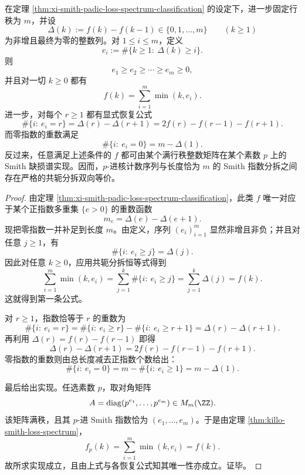 \begin{theorem}\label{thm:xi-smith-loss-spectrum-conjugate-partition-realization}
在定理 \ref{thm:xi-smith-padic-loss-spectrum-classification} 的设定下，进一步固定行秩为 \(m\)，并设
\[
\Delta(k):=f(k)-f(k-1)\in\{0,1,\dots,m\}
\qquad(k\ge 1)
\]
为非增且最终为零的整数列。对 \(1\le i\le m\)，定义
\[
e_i:=\#\{k\ge 1:\ \Delta(k)\ge i\}.
\]
则
\[
e_1\ge e_2\ge \cdots\ge e_m\ge 0,
\]
并且对一切 \(k\ge 0\) 都有
\[
\boxed{\;
f(k)=\sum_{i=1}^{m}\min(k,e_i).\;}
\]
进一步，对每个 \(r\ge 1\) 都有显式恢复公式
\[
\boxed{\;
\#\{i:\ e_i=r\}
=
\Delta(r)-\Delta(r+1)
=
2f(r)-f(r-1)-f(r+1).\;}
\]
而零指数的重数满足
\[
\boxed{\;
\#\{i:\ e_i=0\}=m-\Delta(1).\;}
\]
反过来，任意满足上述条件的 \(f\) 都可由某个满行秩整数矩阵在某个素数 \(p\) 上的 Smith 缺损谱实现。因而，\(p\)-进核计数序列与长度恰为 \(m\) 的 Smith 指数分拆之间存在严格的共轭分拆双向等价。
\end{theorem}
\begin{proof}
由定理 \ref{thm:xi-smith-padic-loss-spectrum-classification}，此类 \(f\) 唯一对应于某个正指数多重集 \(\{e>0\}\) 的重数函数
\[
m_e=\Delta(e)-\Delta(e+1).
\]
现把零指数一并补足到长度 \(m\)。由定义，序列 \((e_i)_{i=1}^{m}\) 显然非增且非负；并且对任意 \(j\ge 1\)，有
\[
\#\{i:\ e_i\ge j\}=\Delta(j).
\]
因此对任意 \(k\ge 0\)，应用共轭分拆恒等式得到
\[
\sum_{i=1}^{m}\min(k,e_i)
=
\sum_{j=1}^{k}\#\{i:\ e_i\ge j\}
=
\sum_{j=1}^{k}\Delta(j)
=
f(k).
\]
这就得到第一条公式。

对 \(r\ge 1\)，指数恰等于 \(r\) 的重数为
\[
\#\{i:\ e_i=r\}
=
\#\{i:\ e_i\ge r\}-\#\{i:\ e_i\ge r+1\}
=
\Delta(r)-\Delta(r+1).
\]
再利用 \(\Delta(r)=f(r)-f(r-1)\) 即得
\[
\Delta(r)-\Delta(r+1)=2f(r)-f(r-1)-f(r+1).
\]
零指数的重数则由总长度减去正指数个数给出：
\[
\#\{i:\ e_i=0\}=m-\#\{i:\ e_i\ge 1\}=m-\Delta(1).
\]

最后给出实现。任选素数 \(p\)，取对角矩阵
\[
A=\operatorname{diag}(p^{e_1},\dots,p^{e_m})\in M_m(\ZZ).
\]
该矩阵满秩，且其 \(p\)-进 Smith 指数恰为 \((e_1,\dots,e_m)\)。于是由定理 \ref{thm:killo-smith-loss-spectrum}，
\[
f_p(k)=\sum_{i=1}^{m}\min(k,e_i)=f(k).
\]
故所求实现成立，且由上式与各恢复公式知其唯一性亦成立。证毕。
\end{proof}


